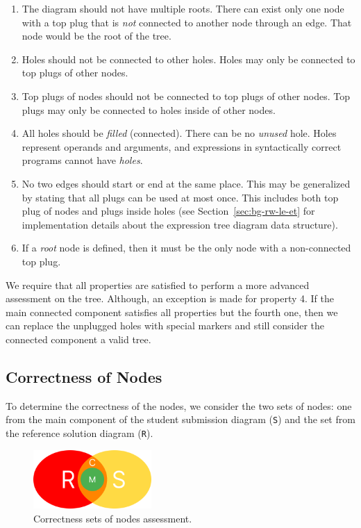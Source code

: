 \begin{chapterBody}
\begin{enumerate}
    \item The diagram should not have multiple roots. There can exist only one
node with a top plug that is \emph{not} connected to another node through an edge. That node
would be the root of the tree.
    \item Holes should not be connected to other holes. Holes may only be
connected to top plugs of other nodes.
    \item Top plugs of nodes should not be connected to top plugs of other
nodes. Top plugs may only be connected to holes inside of other nodes.
    \item All holes should be \textit{filled} (connected). There can be no
\textit{unused} hole. Holes represent operands and arguments, and expressions
in syntactically correct programs cannot have \textit{holes}.
    \item No two edges should start or end at the same place. This may be
generalized by stating that all plugs can be used at most once. This includes
both top plug of nodes and plugs inside holes (see Section~\ref{sec:bg-rw-le-et}
for implementation details about the expression tree diagram data structure).
    \item If a \textit{root} node is defined, then it must be the only node
with a non-connected top plug.
\end{enumerate}

We require that all properties are satisfied to perform a more advanced
assessment on the tree. Although, an exception is made for property 4.
If the main connected component satisfies all properties but the fourth one,
then we can replace the unplugged holes with special markers and still consider
the connected component a valid tree.

\subsection{Correctness of Nodes}\label{sec:fb-assess-nodes}

To determine the correctness of the nodes, we consider the two sets of nodes:
one from the main component of the student submission diagram (\texttt{S}) and
the set from the reference solution diagram (\texttt{R}).

\begin{figure}[ht]
    \centering
    \includegraphics[width=0.4\textwidth]{res/7/assessment_correctness.png}
    \caption{Correctness sets of nodes assessment.}
    \label{fig:fb-assess-correctness-sets}
\end{figure}


\end{chapterBody}
